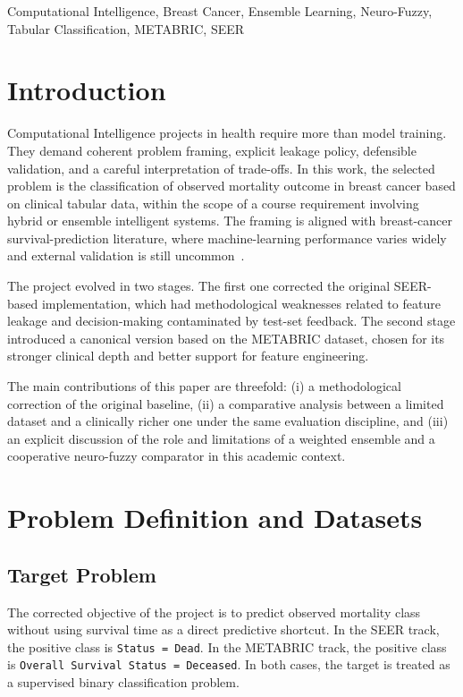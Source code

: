 \documentclass[conference]{IEEEtran}
\begin{document}
\begin{IEEEkeywords}
Computational Intelligence, Breast Cancer, Ensemble Learning, Neuro-Fuzzy, Tabular Classification, METABRIC, SEER
\end{IEEEkeywords}

\section{Introduction}

Computational Intelligence projects in health require more than model training. They demand coherent problem framing, explicit leakage policy, defensible validation, and a careful interpretation of trade-offs. In this work, the selected problem is the classification of observed mortality outcome in breast cancer based on clinical tabular data, within the scope of a course requirement involving hybrid or ensemble intelligent systems. The framing is aligned with breast-cancer survival-prediction literature, where machine-learning performance varies widely and external validation is still uncommon~\cite{li2021}.

The project evolved in two stages. The first one corrected the original SEER-based implementation, which had methodological weaknesses related to feature leakage and decision-making contaminated by test-set feedback. The second stage introduced a canonical version based on the METABRIC dataset, chosen for its stronger clinical depth and better support for feature engineering.

The main contributions of this paper are threefold: (i) a methodological correction of the original baseline, (ii) a comparative analysis between a limited dataset and a clinically richer one under the same evaluation discipline, and (iii) an explicit discussion of the role and limitations of a weighted ensemble and a cooperative neuro-fuzzy comparator in this academic context.

\section{Problem Definition and Datasets}

\subsection{Target Problem}

The corrected objective of the project is to predict observed mortality class without using survival time as a direct predictive shortcut. In the SEER track, the positive class is \texttt{Status = Dead}. In the METABRIC track, the positive class is \texttt{Overall Survival Status = Deceased}. In both cases, the target is treated as a supervised binary classification problem.
\end{document}
